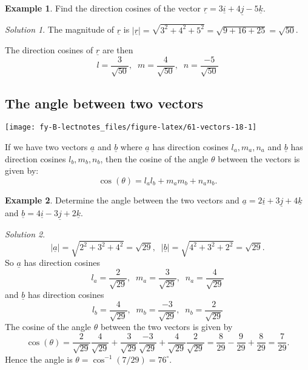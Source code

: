 \documentclass[
  11pt,
  oneside]{book}
\newcommand{\slide}{}
\theoremstyle{definition}
\theoremstyle{definition}
\newtheorem{example}{Example}[chapter]
\theoremstyle{definition}
\theoremstyle{definition}
\theoremstyle{remark}
\newtheorem*{solution}{Solution}
\begin{document}
\begin{example}
Find the direction cosines of the vector \(\underline r = 3\underline i + 4\underline j - 5\underline k\).
\end{example}

\begin{solution}
The magnitude of \(\underline r\) is \(|\underline r| = \sqrt{3^2+4^2+5^2} = \sqrt{9+16+25} = \sqrt{50}\).

The direction cosines of \(\underline r\) are then
\[
l = \frac{3}{\sqrt{50}},\;\;m = \frac{4}{\sqrt{50}},\;\;n = \frac{-5}{\sqrt{50}}
\]
\end{solution}

\slide

\subsection{The angle between two vectors}\label{the-angle-between-two-vectors}

\begin{center}\texttt{[image: fy-B-lectnotes\_files/figure-latex/61-vectors-18-1]} \end{center}

If we have two vectors \(\underline a\) and \(\underline b\) where \(\underline a\) has direction cosines \(l_a, m_a, n_a\) and \(\underline b\) has direction cosines \(l_b, m_b, n_b\), then the cosine of the angle \(\theta\) between the vectors is given by:
\[
\cos(\theta) = l_al_b + m_am_b + n_an_b.
\]
\slide

\begin{example}
Determine the angle between the two vectors and \(\underline a = 2\underline i + 3\underline j + 4\underline k\) and \(\underline b = 4\underline i - 3\underline j + 2\underline k\).
\end{example}

\begin{solution}
\[
|\underline a| = \sqrt{2^2+3^2+4^2} = \sqrt{29},\;\;|\underline b| = \sqrt{4^2+3^2+2^2} = \sqrt{29}.
\]
So \(\underline a\) has direction cosines
\[
l_a = \frac{2}{\sqrt{29}},\;\;m_a = \frac{3}{\sqrt{29}},\;\;n_a = \frac{4}{\sqrt{29}}
\]
and \(\underline b\) has direction cosines
\[
l_b = \frac{4}{\sqrt{29}},\;\;m_b = \frac{-3}{\sqrt{29}},\;\;n_b = \frac{2}{\sqrt{29}}
\]
The cosine of the angle \(\theta\) between the two vectors is given by
\[
\cos(\theta) = \frac{2}{\sqrt{29}}\frac{4}{\sqrt{29}}+\frac{3}{\sqrt{29}}\frac{-3}{\sqrt{29}}+\frac{4}{\sqrt{29}}\frac{2}{\sqrt{29}} = \frac{8}{29}-\frac{9}{29}+\frac{8}{29} = \frac{7}{29}.
\]
Hence the angle is \(\theta = \cos^{-1}(7/29) = 76^\circ\).
\end{solution}
\end{document}
